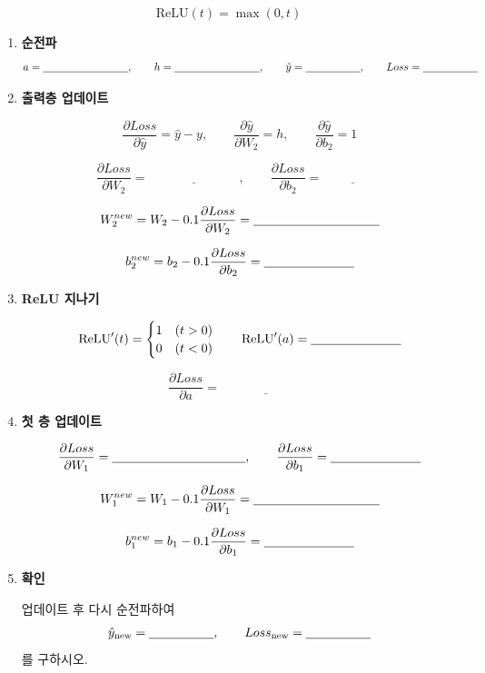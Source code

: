 \documentclass[11pt]{article}
\begin{document}
\[
\mathrm{ReLU}(t)=\max(0,t)
\]

\begin{enumerate}
\item \textbf{순전파}
\[
a=\underline{\hspace{2.8cm}},\qquad
h=\underline{\hspace{2.8cm}},\qquad
\hat y=\underline{\hspace{1.8cm}},\qquad
Loss=\underline{\hspace{1.8cm}}
\]

\item \textbf{출력층 업데이트}

\[
\frac{\partial Loss}{\partial \hat y}=\hat y-y,\qquad
\frac{\partial \hat y}{\partial W_2}=h,\qquad
\frac{\partial \hat y}{\partial b_2}=1
\]

\[
\frac{\partial Loss}{\partial W_2}=\underline{\hspace{3cm}},\qquad
\frac{\partial Loss}{\partial b_2}=\underline{\hspace{2cm}}
\]

\[
W_2^{new}=W_2-0.1\frac{\partial Loss}{\partial W_2}
=\underline{\hspace{3.5cm}}
\]

\[
b_2^{new}=b_2-0.1\frac{\partial Loss}{\partial b_2}
=\underline{\hspace{2.5cm}}
\]

\item \textbf{ReLU 지나기}

\[
\mathrm{ReLU}'(t)=
\begin{cases}
1 & (t>0)\\
0 & (t<0)
\end{cases}
\qquad
\mathrm{ReLU}'(a)=\underline{\hspace{2.5cm}}
\]

\[
\frac{\partial Loss}{\partial a}
=\underline{\hspace{3cm}}
\]

\item \textbf{첫 층 업데이트}

\[
\frac{\partial Loss}{\partial W_1}
=\underline{\hspace{3.7cm}},\qquad
\frac{\partial Loss}{\partial b_1}
=\underline{\hspace{2.5cm}}
\]

\[
W_1^{new}=W_1-0.1\frac{\partial Loss}{\partial W_1}
=\underline{\hspace{3.5cm}}
\]

\[
b_1^{new}=b_1-0.1\frac{\partial Loss}{\partial b_1}
=\underline{\hspace{2.5cm}}
\]

\item \textbf{확인}

업데이트 후 다시 순전파하여
\[
\hat y_{\mathrm{new}}=\underline{\hspace{1.8cm}},\qquad
Loss_{\mathrm{new}}=\underline{\hspace{1.8cm}}
\]
를 구하시오.
\end{enumerate}
\end{document}
